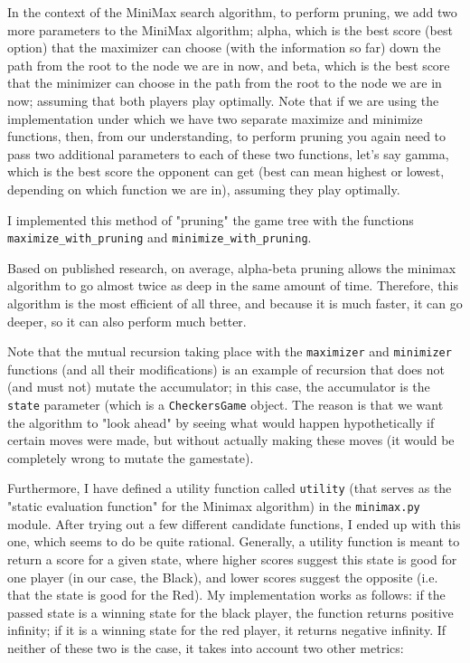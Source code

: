 \documentclass[fontsize=11pt]{article}
\begin{document}
\begin{enumerate}
    In the context of the MiniMax search algorithm, to perform pruning, we add two more parameters to the MiniMax algorithm; alpha, which is the best score (best option) that the maximizer can  choose (with the information so far) down the path from the root to the node we are in now, and beta, which is the best score that the minimizer can choose in the path from the root to the node we are in now; assuming that both players play optimally. Note that if we are using the implementation under which we have two separate maximize and minimize functions, then, from our understanding, to perform pruning you again need to pass two additional parameters to each of these two functions, let’s say gamma, which is the best score the opponent can get (best can mean highest or lowest, depending on which function we are in), assuming they play optimally.

    I implemented this method of "pruning" the game tree with the functions \texttt{maximize\_with\_pruning} and \texttt{minimize\_with\_pruning}.

    Based on published research, on average, alpha-beta pruning allows the minimax algorithm to go almost twice as deep in the same amount of time. Therefore, this algorithm is the most efficient of all three, and because it is much faster, it can go deeper, so it can also perform much better.
\end{enumerate}

Note that the mutual recursion taking place with the \texttt{maximizer} and \texttt{minimizer} functions (and all their modifications) is an example of recursion that does not (and must not) mutate the accumulator; in this case, the accumulator is the \texttt{state} parameter (which is a \texttt{CheckersGame} object. The reason is that we want the algorithm to "look ahead" by seeing what would happen hypothetically if certain moves were made, but without actually making these moves (it would be completely wrong to mutate the gamestate).

Furthermore, I have defined a utility function called \texttt{utility} (that serves as the "static evaluation function" for the Minimax algorithm) in the \texttt{minimax.py} module. After trying out a few different candidate functions, I ended up with this one, which seems to do be quite rational. Generally, a utility function is meant to return a score for a given state, where higher scores suggest this state is good for one player (in our case, the Black), and lower scores suggest the opposite (i.e. that the state is good for the Red). My implementation works as follows: if the passed state is a winning state for the black player, the function returns positive infinity; if it is a winning state for the red player, it returns negative infinity. If neither of these two is the case, it takes into account two other metrics:
\end{document}
